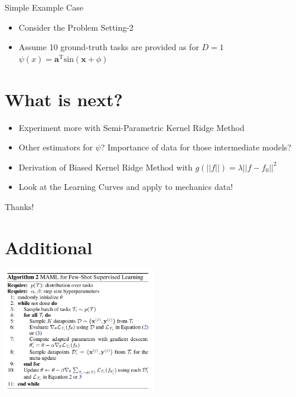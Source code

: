 \documentclass[aspectratio=169]{beamer}
\begin{document}
\begin{frame}{Simple Example Case}
  \begin{minipage}{0.45\textwidth}
  \begin{itemize}
    \item Consider the Problem Setting-2
    \item Assume 10 ground-truth tasks are provided as for $D=1$ $\psi(x)=\mathbf{a}^\text{T}\text{sin}(\mathbf{x}+\phi)$
  \end{itemize}
  \end{minipage}%
  \begin{minipage}{0.55\textwidth}
    
  \end{minipage}
\end{frame}


\section{What is next?}
\begin{frame}
  \begin{itemize}
    \item Experiment more with Semi-Parametric Kernel Ridge Method
    \item Other estimators for $\psi$? Importance of data for those intermediate models?
    \item Derivation of Biased Kernel Ridge Method with $g(||f||)=\lambda||f-f_0||^2$ 
    \item Look at the Learning Curves and apply to mechanics data!
  \end{itemize}
\end{frame}

\begin{frame}
  \centering
  \color{Pink} Thanks!
\end{frame}

\section{Additional}
\begin{frame}
  \centering
  \includegraphics[width=0.5\textwidth]{Figures/maml.png}
\end{frame}

\end{document}
